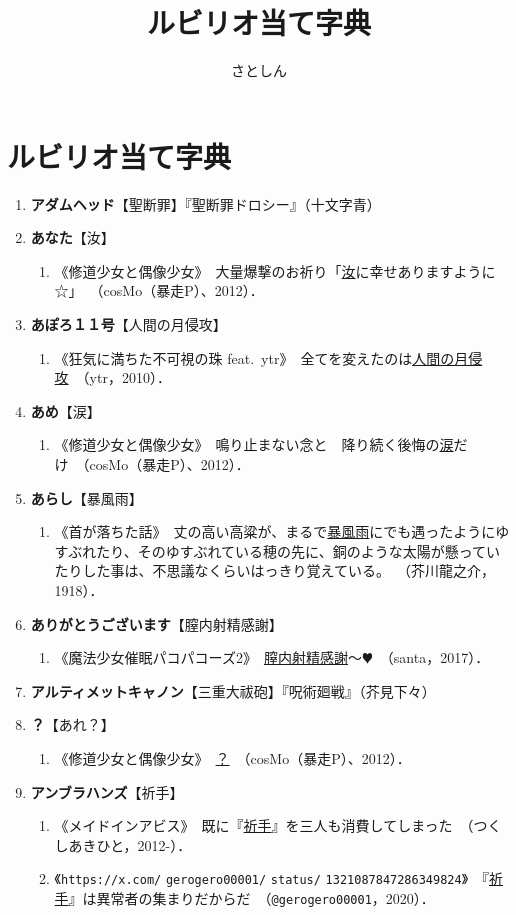 \documentclass[twocolumn]{jsbook}
\title{ルビリオ当て字典}
\author{
さとしん
}
\newcommand{\exsentence}[3]{\item 《#1》\ #2\ （#3）．}
\newcommand{\exlist}[1]{
\begin{enumerate}[label= \raise0.2ex\hbox{\textcircled{\scriptsize{\arabic*}}}]
        #1
\end{enumerate}
}
\newcommand{\NoLabSectionTable}[1]{
    \section*{#1}
    \addcontentsline{toc}{section}{#1}
}
\begin{document}
\maketitle
\tableofcontents

\chapter{ルビリオ当て字典}

\noindent
\begin{enumerate}
\NoLabSectionTable{あ}

    \item \textbf{アダムヘッド}【聖断罪】『聖断罪ドロシー』（十文字青）
    \item \textbf{あなた}【汝】
    \exlist{
    	\exsentence{修道少女と偶像少女}{大量爆撃のお祈り「\uline{汝}に幸せありますように☆」}{cosMo（暴走P）、2012}
    }
    \item \textbf{あぽろ１１号}【人間の月侵攻】
    \exlist{
    	\exsentence{狂気に満ちた不可視の珠 feat.~ytr}{全てを変えたのは\uline{人間の月侵攻}}{ytr，2010}
    }
    \item \textbf{あめ}【涙】
    \exlist{
    	\exsentence{修道少女と偶像少女}{鳴り止まない念と　降り続く後悔の\uline{涙}だけ}{cosMo（暴走P）、2012}
    }
    \item \textbf{あらし}【暴風雨】
    \exlist{
    	\exsentence{首が落ちた話}{丈の高い高粱が、まるで\uline{暴風雨}にでも遇ったようにゆすぶれたり、そのゆすぶれている穂の先に、銅のような太陽が懸っていたりした事は、不思議なくらいはっきり覚えている。}{芥川龍之介，1918}
    }
    \item \textbf{ありがとうございます}【膣内射精感謝】
    \exlist{
    	\exsentence{魔法少女催眠パコパコーズ2}{\uline{膣内射精感謝}～$\varheartsuit$}{santa，2017}
    }
    \item \textbf{アルティメットキャノン}【三重大祓砲】『呪術廻戦』（芥見下々）
    \item \textbf{？}【あれ？】
    \exlist{
    	\exsentence{修道少女と偶像少女}{\uline{？}}{cosMo（暴走P）、2012}
    }
    \item \textbf{アンブラハンズ}【祈手】
    \exlist{
    	\exsentence{メイドインアビス}{既に『\uline{祈手}』を三人も消費してしまった}{つくしあきひと，2012-}
    	\exsentence{\texttt{https://x.com/} \texttt{gerogero00001/} \texttt{status/} \texttt{1321087847286349824}}{『\uline{祈手}』は異常者の集まりだからだ}{\texttt{@gerogero00001}，2020}
    }
    

\end{enumerate}
\end{document}
